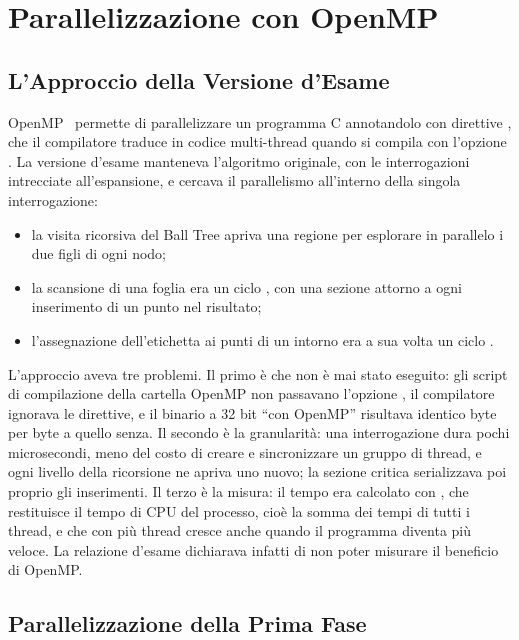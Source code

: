 \chapter{Parallelizzazione con OpenMP}
\label{cap:openmp}

\section{L'Approccio della Versione d'Esame}

OpenMP~\cite{openmp} permette di parallelizzare un programma C annotandolo con direttive , che il compilatore traduce in codice multi-thread quando si compila con l'opzione . La versione d'esame manteneva l'algoritmo originale, con le interrogazioni intrecciate all'espansione, e cercava il parallelismo all'interno della singola interrogazione:

\begin{itemize}
    \item la visita ricorsiva del Ball Tree apriva una regione  per esplorare in parallelo i due figli di ogni nodo;
    \item la scansione di una foglia era un ciclo , con una sezione  attorno a ogni inserimento di un punto nel risultato;
    \item l'assegnazione dell'etichetta ai punti di un intorno era a sua volta un ciclo .
\end{itemize}

L'approccio aveva tre problemi. Il primo è che non è mai stato eseguito: gli script di compilazione della cartella OpenMP non passavano l'opzione , il compilatore ignorava le direttive, e il binario a 32 bit \enquote{con OpenMP} risultava identico byte per byte a quello senza. Il secondo è la granularità: una interrogazione dura pochi microsecondi, meno del costo di creare e sincronizzare un gruppo di thread, e ogni livello della ricorsione ne apriva uno nuovo; la sezione critica serializzava poi proprio gli inserimenti. Il terzo è la misura: il tempo era calcolato con , che restituisce il tempo di CPU del processo, cioè la somma dei tempi di tutti i thread, e che con più thread cresce anche quando il programma diventa più veloce. La relazione d'esame dichiarava infatti di non poter misurare il beneficio di OpenMP.

\section{Parallelizzazione della Prima Fase}

